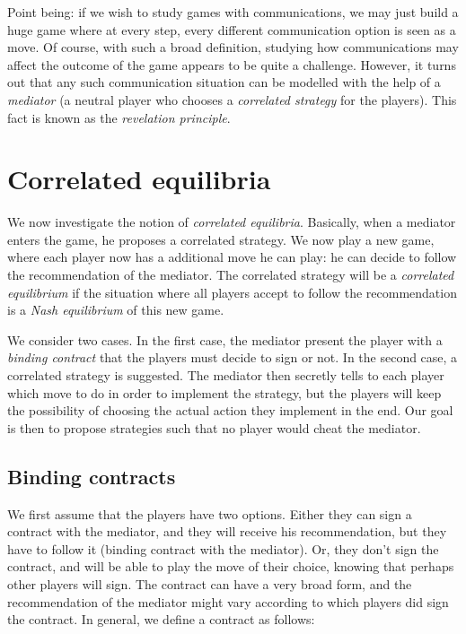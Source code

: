 Point being: if we wish to study games with communications, we may just build a huge game where at every step, every different communication option is seen as a move. Of course, with such a broad definition, studying how communications may affect the outcome of the game appears to be quite a challenge. However, it turns out that any such communication situation can be modelled with the help of  a \emph{mediator} (a neutral player who chooses a \emph{correlated strategy} for the players). This fact is known as the \emph{revelation principle}.




\section{Correlated equilibria}

We now investigate the notion of \emph{correlated equilibria}. 
Basically, when a mediator enters the game, he proposes a correlated strategy. We now play a new game, where each player now has a additional move he can play: he can decide to follow the recommendation of the mediator. The correlated strategy will be a \emph{correlated equilibrium} if the situation where all players accept to follow the recommendation is a \emph{Nash equilibrium} of this new game.

We consider two cases. In the first case, the mediator present the player with a \emph{binding contract} that the players must decide to sign or not. In the second case, a correlated strategy is suggested. The mediator then secretly tells to each player which move to do in order to implement the strategy, but the players will keep the possibility of choosing the actual action they implement in the end. Our goal is then to propose strategies such that no player would cheat the mediator.

\subsection{Binding contracts}
\label{ch5:sec:cont}
We first assume that the players have two options. Either they can sign a contract with the mediator, and they will receive his recommendation, but they have to follow it (binding contract with the mediator). Or, they don't sign the contract, and will be able to play the move of their choice, knowing that perhaps other players will sign.  
The contract can have a very broad form, and the recommendation of the mediator might vary according to which players did sign the contract. In general, we define a contract as follows:

